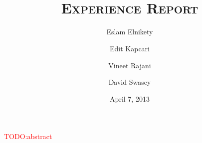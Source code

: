 \documentclass[a4paper]{article}
\title{\TITLE \\
	{\small\textsc{Experience Report}}%
}
\author{Eslam Elnikety \and Edit Kapcari \and Vineet Rajani \and David Swasey}
\date{April 7, 2013}
\newcommand{\todo}[1]{\textcolor{red} {TODO:{#1}} }
\begin{document}
\maketitle

\todo{abstract}





\nocite{*}	%

\appendix


\end{document}
